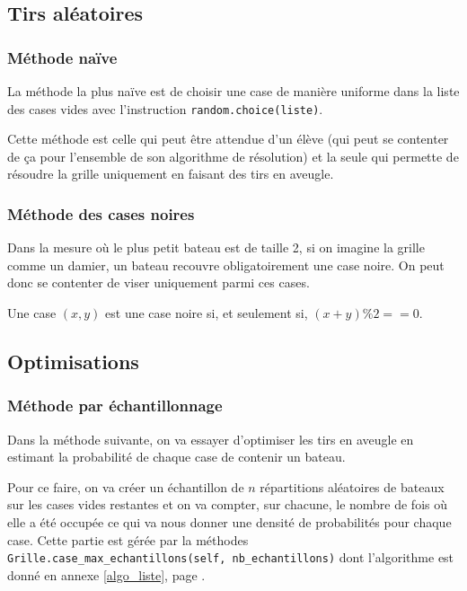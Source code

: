 \subsection{Tirs aléatoires}

\subsubsection{Méthode naïve}
La méthode la plus naïve est de choisir une case de manière uniforme dans la liste des cases vides avec l'instruction \texttt{random.choice(liste)}.

Cette méthode est celle qui peut être attendue d'un élève (qui peut se contenter de ça pour l'ensemble de son algorithme de résolution) et la seule qui permette de résoudre la grille uniquement en faisant des tirs en aveugle.

\subsubsection{Méthode des cases noires}
Dans la mesure où le plus petit bateau est de taille 2, si on imagine la grille comme un damier, un bateau recouvre obligatoirement une case noire. On peut donc se contenter de viser uniquement parmi ces cases.

Une case $(x,y)$ est une case noire si, et seulement si, $(x+y)\%2==0$.

\subsection{Optimisations}

\subsubsection{Méthode par échantillonnage}
Dans la méthode suivante, on va essayer d'optimiser les tirs en aveugle en estimant la probabilité de chaque case de contenir un bateau.

Pour ce faire, on va créer un échantillon de $n$ répartitions aléatoires de bateaux sur les cases vides restantes et on va compter, sur chacune, le nombre de fois où elle a été occupée ce qui va nous donner une densité de probabilités pour chaque case. Cette partie est gérée par la méthodes \texttt{Grille.case\_max\_echantillons(self, nb\_echantillons)} dont l'algorithme est donné en annexe \ref{algo_liste}, page \pageref{case_max_echantillons}.

